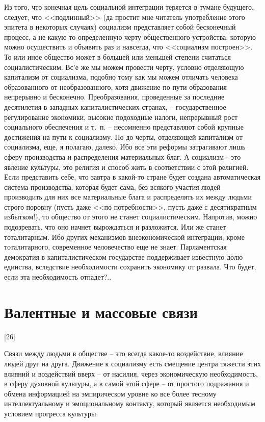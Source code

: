 \documentclass{book}
\begin{document}
Из того, что конечная цель социальной интеграции теряется в тумане будущего, следует, что <<подлинный>> (да простит мне читатель употребление этого эпитета в некоторых случаях) социализм представляет собой бесконечный процесс, а не какую-то определенную черту общественного устройства, которую можно осуществить и объявить раз и навсегда, что <<социализм построен>>. То или иное общество может в большей или мень­шей степени считаться социалистическим. Вс'е же мы можем провести черту, условно отделяющую капитализм от социализ­ма, подобно тому как мы можем отличать человека образо­ванного от необразованного, хотя движение по пути образо­вания непрерывно и бесконечно. Преобразования, проведенные за последние десятилетия в западных капиталистических стра­нах, -- государственное регулирование экономики, высокие по­доходные налоги, непрерывный рост социального обеспечения и т.~п. -- несомненно представляют собой крупные достижения на пути к социализму. Но до черты, отделяющей капитализм от социализма, еще, я полагаю, 
далеко. Ибо все эти реформы за­трагивают лишь сферу производства и распределения матери­альных благ. А социализм - это явление культуры, это религия и способ жить в соответствии с этой религией. Если предста­вить себе, что завтра в какой-то стране будет создана автомати­ческая система производства, которая будет сама, без всякого участия людей  производить для них все материальные блага и распределять их между людьми строго поровну (пусть даже <<по потребности>>, пусть даже с десятикратным избытком!), то общество от этого не станет социалистическим. Напротив, можно подозревать, что оно начнет вырождаться и разложится. Или же станет тоталитарным. Ибо других механизмов внеэконо­мической интеграции, кроме тоталитарного, современное чело­вечество еще не знает. Парламентская демократия в капитали­стическом государстве поддерживает известную долю единства, вследствие необходимости сохранить экономику от развала. Что будет, если эта необходимость отпадет?..



\section{Валентные и массовые связи}
[26]

Связи между людьми в обществе -- это всегда какое-то воздействие, влияние людей друг на друга. Движение к социализму есть смещение центра тяжести этих влияний и воздействий вверх -- от насилия, через экономическую необходимость, в сферу духовной культуры, а в самой этой сфере -- от простого подражания и обмена информацией на эмпирическом уровне ко все более тесному интеллектуальному и эмоциональному контакту, который является необходимым условием прогресса культуры.
\end{document}
